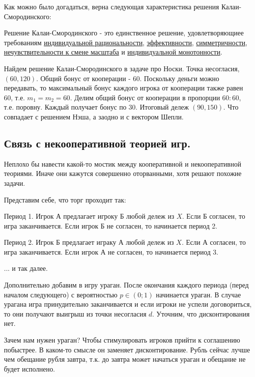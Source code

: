 Как можно было догадаться, верна следующая характеристика решения Калаи-Смородинского:
\begin{myth} Решение Калаи-Смородинского - это единственное решение, удовлетворяющиее
требованиям \hyperref[irationality]{индивидуальной рациональности}, \hyperref[Pareto]{эффективности}, \hyperref[symmetry]{симметричности}, \hyperref[scale_invariance]{нечувствительности к смене масштаба} и \hyperref[imonotonicity]{индивидуальной монотонности}.
\end{myth}

Найдем решение Калаи-Смородинского в задаче про Носки. Точка несогласия,
$(60,120)$. Общий бонус от кооперации - $60$. Поскольку деньги можно
передавать, то максимальный бонус каждого игрока от кооперации также
равен $60$, т.е. $m_{1}=m_{2}=60$. Делим общий бонус от кооперации
в пропорции $60:60$, т.е. поровну. Каждый получает бонус по $30$.
Итоговый дележ $(90,150).$ Что совпадает с решением Нэша, а заодно
и с вектором Шепли.


\subsection{Связь с некооперативной теорией игр.}

Неплохо бы навести какой-то мостик между кооперативной и некооперативной
теориями. Иначе они кажутся совершенно оторванными, хотя решают похожие
задачи.

Представим себе, что торг проходит так:

Период 1. Игрок А предлагает игроку Б любой дележ из $X$. Если Б
согласен, то игра заканчивается. Если игрок Б не согласен, то начинается
период 2.

Период 2. Игрок Б предлагает играку А любой дележ из $X$. Если А
согласен, то игра заканчивается. Если игрок А не согласен, то начинается
период 3.

... и так далее.

Дополнительно добавим в игру ураган. После окончания каждого периода (перед началом следующего) с вероятностью $p\in (0;1)$ начинается ураган.  В случае урагана игра
принудительно заканчивается и если игроки не успели договориться,
то они получают выигрыш из точки несогласия $d$. Уточним, что дисконтирования
нет.

Зачем нам нужен ураган? Чтобы стимулировать игроков прийти к соглашению
побыстрее. В каком-то смысле он заменяет дисконтирование. Рубль сейчас
лучше чем обещание рубля завтра, т.к. до завтра может начаться ураган
и обещание не будет исполнено.

